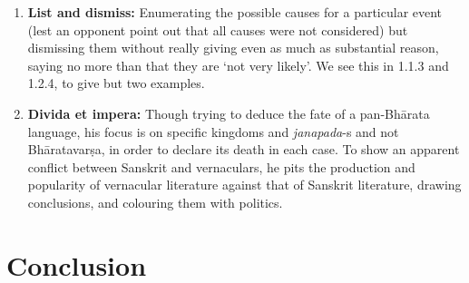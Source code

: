 \begin{enumerate}
\item {\bf List and dismiss:} Enumerating the possible causes for a particular event (lest an opponent point out that all causes were not considered) but dismissing them without really giving even as much as substantial reason, saying no more than that they are ‘not very likely’. We see this in 1.1.3 and 1.2.4, to give but two examples. 
\item {\bf Divida et impera:} Though trying to deduce the fate of a pan-Bhārata language, his focus is on specific kingdoms and {\sl janapada}-s and not Bhāratavarṣa, in order to declare its death in each case. To show an apparent conflict between Sanskrit and vernaculars, he pits the production and popularity of vernacular literature against that of Sanskrit literature, drawing conclusions, and colouring them with politics.
\end{enumerate}

\section{Conclusion}

